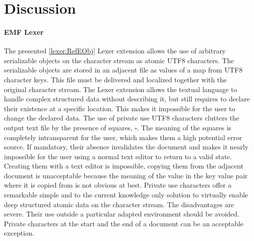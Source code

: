 

\section{Discussion}

%
\paragraph{EMF Lexer} The presented \ref{lexer:RefEObj} Lexer extension allows the use of arbitrary serializable objects on the character stream as atomic UTF8 characters. The serializable objects are stored in an adjacent file as values of a map from UTF8 character keys. This file must be delivered and localized together with the original character stream. The Lexer extension allows the textual language to handle complex structured data without describing it, but still requires to declare their existence at a specific location. This makes it impossible for the user to change the declared data. The use of private use UTF8 characters clutters the output text file by the presence of squares, $\square$. The meaning of the squares is completely intransparent for the user, which makes them a high potential error source. If mandatory, their absence invalidates the document and makes it nearly impossible for the user using a normal text editor to return to a valid state. Creating them with a text editor is impossible, copying them from the adjacent document is unacceptable because the meaning of the value in the key value pair where it is copied from is not obvious at best. Private use characters offer a remarkable simple and to the current knowledge only solution to virtually enable deep structured atomic data on the character stream. The disadvantages are severe. Their use outside a particular adapted environment should be avoided. Private characters at the start and the end of a document can be an acceptable exception. 

